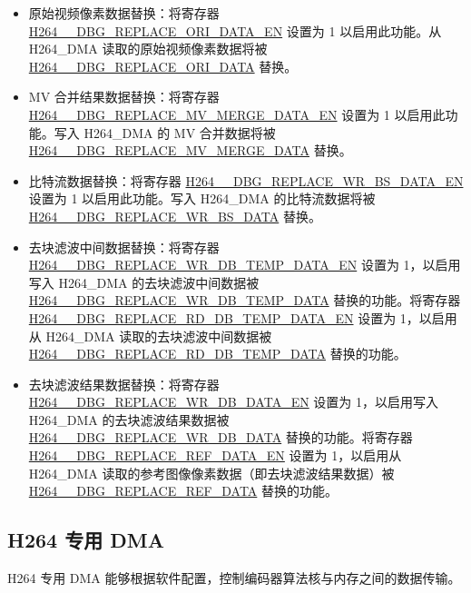 \documentclass[main\_\_CN.tex]{subfiles}
\begin{document}
\begin{itemize}
    \item 原始视频像素数据替换：将寄存器 \hyperref[fielddesc:H264DBGREPLACEORIDATAEN]{H264\_\_DBG\_REPLACE\_ORI\_DATA\_EN} 设置为 1 以启用此功能。从 H264\_DMA 读取的原始视频像素数据将被 \hyperref[fielddesc:H264DBGREPLACEORIDATA]{H264\_\_DBG\_REPLACE\_ORI\_DATA} 替换。
    \item MV 合并结果数据替换：将寄存器 \hyperref[fielddesc:H264DBGREPLACEMVMERGEDATAEN]{H264\_\_DBG\_REPLACE\_MV\_MERGE\_DATA\_EN} 设置为 1 以启用此功能。写入 H264\_DMA 的 MV 合并数据将被 \hyperref[fielddesc:H264DBGREPLACEMVMERGEDATA]{H264\_\_DBG\_REPLACE\_MV\_MERGE\_DATA} 替换。
    \item 比特流数据替换：将寄存器 \hyperref[fielddesc:H264DBGREPLACEWRBSDATAEN]{H264\_\_DBG\_REPLACE\_WR\_BS\_DATA\_EN} 设置为 1 以启用此功能。写入 H264\_DMA 的比特流数据将被 \hyperref[fielddesc:H264DBGREPLACEWRBSDATA]{H264\_\_DBG\_REPLACE\_WR\_BS\_DATA} 替换。
    \item 去块滤波中间数据替换：将寄存器 \hyperref[fielddesc:H264DBGREPLACEWRDBTEMPDATAEN]{H264\_\_DBG\_REPLACE\_WR\_DB\_TEMP\_DATA\_EN} 设置为 1，以启用写入 H264\_DMA 的去块滤波中间数据被 \hyperref[fielddesc:H264DBGREPLACEWRDBTEMPDATA]{H264\_\_DBG\_REPLACE\_WR\_DB\_TEMP\_DATA} 替换的功能。将寄存器 \hyperref[fielddesc:H264DBGREPLACERDDBTEMPDATAEN]{H264\_\_DBG\_REPLACE\_RD\_DB\_TEMP\_DATA\_EN} 设置为 1，以启用从 H264\_DMA 读取的去块滤波中间数据被 \hyperref[fielddesc:H264DBGREPLACERDDBTEMPDATA]{H264\_\_DBG\_REPLACE\_RD\_DB\_TEMP\_DATA} 替换的功能。
    \item 去块滤波结果数据替换：将寄存器 \hyperref[fielddesc:H264DBGREPLACEWRDBDATAEN]{H264\_\_DBG\_REPLACE\_WR\_DB\_DATA\_EN} 设置为 1，以启用写入 H264\_DMA 的去块滤波结果数据被 \hyperref[fielddesc:H264DBGREPLACEWRDBDATA]{H264\_\_DBG\_REPLACE\_WR\_DB\_DATA} 替换的功能。将寄存器 \hyperref[fielddesc:H264DBGREPLACEREFDATAEN]{H264\_\_DBG\_REPLACE\_REF\_DATA\_EN} 设置为 1，以启用从 H264\_DMA 读取的参考图像像素数据（即去块滤波结果数据）被 \hyperref[fielddesc:H264DBGREPLACEREFDATA]{H264\_\_DBG\_REPLACE\_REF\_DATA} 替换的功能。
\end{itemize}

\subsection{H264 专用 DMA}\label{sec:h264-dma}
H264 专用 DMA 能够根据软件配置，控制编码器算法核与内存之间的数据传输。
\end{document}
